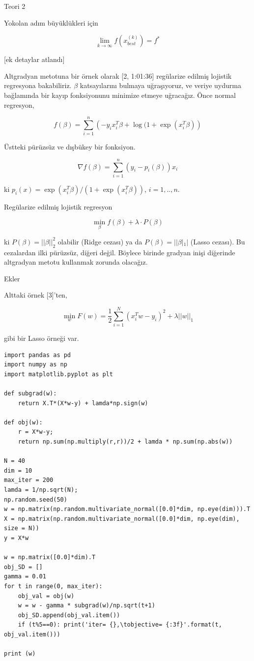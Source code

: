\documentclass[12pt,fleqn]{article}\usepackage{../../common}
\begin{document}
Teori 2

Yokolan adım büyüklükleri için

$$
\lim_{k \to \infty} f(x_{best}^{(k)} ) = f^*
$$

[ek detaylar atlandı]

Altgradyan metotuna bir örnek olarak [2, 1:01:36] regülarize edilmiş
lojistik regresyona bakabiliriz. $\beta$ katsayılarını bulmaya uğraşıyoruz,
ve veriye uydurma bağlamında bir kayıp fonksiyonunu minimize etmeye
uğracağız. Önce normal regresyon,

$$
f(\beta) = \sum _{i=1}^{n} \left(-y_ix_i^T\beta + \log( 1 + \exp (x_i^T\beta) \right) 
$$

Üstteki pürüzsüz ve dışbükey bir fonksiyon. 

$$
\nabla f(\beta) = \sum _{i=1}^{n} (y_i - p_i(\beta)) x_i
$$

ki $p_i(x) = \exp(x_i^T\beta) / (1+ \exp(x_i^T\beta))$, $i=1,..,n$. 

Regülarize edilmiş lojistik regresyon

$$
\min_\beta f(\beta) + \lambda \cdot P(\beta)
$$

ki $P(\beta) = ||\beta||_2^2$ olabilir (Ridge cezası) ya da
$P(\beta) = ||\beta|_1|$ (Lasso cezası). Bu cezalardan ilki pürüzsüz,
diğeri değil. Böylece birinde gradyan inişi diğerinde altgradyan metotu
kullanmak zorunda olacağız.

Ekler

Alttaki örnek [3]'ten,

$$
\min_w F(w) = \frac{1}{2} \sum _{i=1}^{N} (x_i^T w - y_i)^2 + \lambda ||w||_1
$$

gibi bir Lasso örneği var. 

\begin{verbatim}
import pandas as pd
import numpy as np
import matplotlib.pyplot as plt

def subgrad(w):
    return X.T*(X*w-y) + lamda*np.sign(w)

def obj(w):
    r = X*w-y;
    return np.sum(np.multiply(r,r))/2 + lamda * np.sum(np.abs(w))

N = 40
dim = 10
max_iter = 200
lamda = 1/np.sqrt(N);
np.random.seed(50)
w = np.matrix(np.random.multivariate_normal([0.0]*dim, np.eye(dim))).T
X = np.matrix(np.random.multivariate_normal([0.0]*dim, np.eye(dim), size = N))
y = X*w

w = np.matrix([0.0]*dim).T
obj_SD = []
gamma = 0.01
for t in range(0, max_iter):
    obj_val = obj(w)
    w = w - gamma * subgrad(w)/np.sqrt(t+1)
    obj_SD.append(obj_val.item())
    if (t%5==0): print('iter= {},\tobjective= {:3f}'.format(t, obj_val.item()))

print (w)
\end{verbatim}
\end{document}
